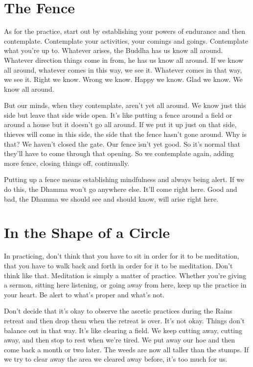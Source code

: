 \section{The Fence}

As for the practice, start out by establishing your powers of endurance and then contemplate. Contemplate your activities, your comings and goings. Contemplate what you're up to. Whatever arises, the Buddha has us know all around. Whatever direction things come in from, he has us know all around. If we know all around, whatever comes in this way, we see it. Whatever comes in that way, we see it. Right we know. Wrong we know. Happy we know. Glad we know. We know all around.

But our minds, when they contemplate, aren't yet all around. We know just this side but leave that side wide open. It's like putting a fence around a field or around a house but it doesn't go all around. If we put it up just on that side, thieves will come in this side, the side that the fence hasn't gone around. Why is that? We haven't closed the gate. Our fence isn't yet good. So it's normal that they'll have to come through that opening. So we contemplate again, adding more fence, closing things off, continually.

Putting up a fence means establishing mindfulness and always being alert. If we do this, the Dhamma won't go anywhere else. It'll come right here. Good and bad, the Dhamma we should see and should know, will arise right here.

\clearpage

\section{In the Shape of a Circle}

In practicing, don't think that you have to sit in order for it to be meditation, that you have to walk back and forth in order for it to be meditation. Don't think like that. Meditation is simply a matter of practice. Whether you're giving a sermon, sitting here listening, or going away from here, keep up the practice in your heart. Be alert to what's proper and what's not.

Don't decide that it's okay to observe the ascetic practices during the Rains retreat and then drop them when the retreat is over. It's not okay. Things don't balance out in that way. It's like clearing a field. We keep cutting away, cutting away, and then stop to rest when we're tired. We put away our hoe and then come back a month or two later. The weeds are now all taller than the stumps. If we try to clear away the area we cleared away before, it's too much for us.

